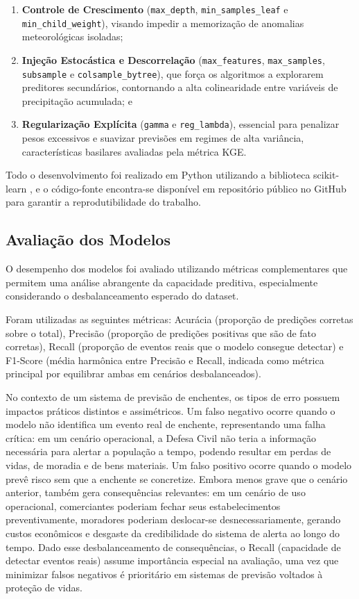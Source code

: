 \documentclass[12pt]{article}
\begin{document}
\begin{enumerate}
    \item \textbf{Controle de Crescimento} (\texttt{max\_depth}, \texttt{min\_samples\_leaf} e \texttt{min\_child\_weight}), visando impedir a memorização de anomalias meteorológicas isoladas;
    \item \textbf{Injeção Estocástica e Descorrelação} (\texttt{max\_features}, \texttt{max\_samples}, \texttt{subsample} e \texttt{colsample\_bytree}), que força os algoritmos a explorarem preditores secundários, contornando a alta colinearidade entre variáveis de precipitação acumulada; e
    \item \textbf{Regularização Explícita} (\texttt{gamma} e \texttt{reg\_lambda}), essencial para penalizar pesos excessivos e suavizar previsões em regimes de alta variância, características basilares avaliadas pela métrica KGE.
\end{enumerate}

Todo o desenvolvimento foi realizado em Python utilizando a biblioteca scikit-learn \cite{pedregosa2011}, e o código-fonte encontra-se disponível em repositório público no GitHub para garantir a reprodutibilidade do trabalho.

\subsection{Avaliação dos Modelos}

O desempenho dos modelos foi avaliado utilizando métricas complementares que permitem uma análise abrangente da capacidade preditiva, especialmente considerando o desbalanceamento esperado do dataset.

Foram utilizadas as seguintes métricas: Acurácia (proporção de predições corretas sobre o total), Precisão (proporção de predições positivas que são de fato corretas), Recall (proporção de eventos reais que o modelo consegue detectar) e F1-Score (média harmônica entre Precisão e Recall, indicada como métrica principal por equilibrar ambas em cenários desbalanceados).

No contexto de um sistema de previsão de enchentes, os tipos de erro possuem impactos práticos distintos e assimétricos. Um falso negativo ocorre quando o modelo não identifica um evento real de enchente, representando uma falha crítica: em um cenário operacional, a Defesa Civil não teria a informação necessária para alertar a população a tempo, podendo resultar em perdas de vidas, de moradia e de bens materiais. Um falso positivo ocorre quando o modelo prevê risco sem que a enchente se concretize. Embora menos grave que o cenário anterior, também gera consequências relevantes: em um cenário de uso operacional, comerciantes poderiam fechar seus estabelecimentos preventivamente, moradores poderiam deslocar-se desnecessariamente, gerando custos econômicos e desgaste da credibilidade do sistema de alerta ao longo do tempo. Dado esse desbalanceamento de consequências, o Recall (capacidade de detectar eventos reais) assume importância especial na avaliação, uma vez que minimizar falsos negativos é prioritário em sistemas de previsão voltados à proteção de vidas.
\end{document}
